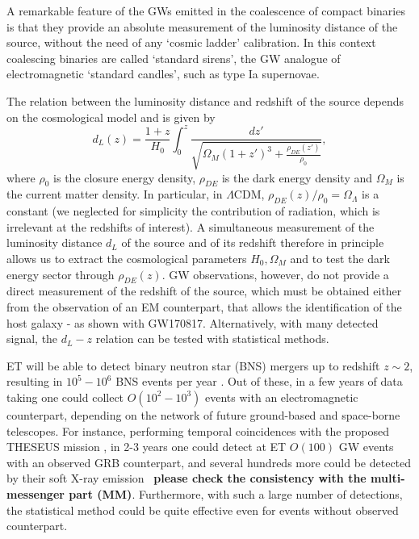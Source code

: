 A remarkable feature of the GWs emitted in the coalescence of compact binaries is that  they  provide an absolute measurement of the luminosity distance of the source, without the need of any `cosmic ladder' calibration. In this context coalescing binaries are called `standard sirens', the GW analogue of electromagnetic `standard candles', such as type Ia supernovae. 

The relation between the luminosity distance and redshift of the source depends on the cosmological model and is given by 
\begin{equation}\label{eq:dL(z)}
d_L(z)=\frac{1+z}{H_0}\int_0^z \frac{dz'}{\sqrt{\Omega_M(1+z')^3+\frac{\rho_{DE}(z')}{\rho_0}}},
\end{equation}
where $\rho_0$ is the closure energy density, $\rho_{DE}$ is the dark energy density and $\Omega_M$ is the current matter density. In particular, in $\Lambda$CDM, $\rho_{DE}(z)/\rho_0=\Omega_{\Lambda}$ is a constant (we neglected for simplicity the contribution of radiation, which is irrelevant at the redshifts of interest). A simultaneous measurement of the luminosity distance $d_L$ of the source and of its redshift therefore in principle allows us to extract the cosmological parameters $H_0,\Omega_M$ and to test the dark energy sector through $\rho_{DE}(z)$. GW observations, however, do not provide a direct measurement of the redshift of the source, which must be obtained either from the observation of an EM counterpart, that allows the identification  of the host galaxy - as shown with GW170817. Alternatively, with many detected signal, the $d_L-z$ relation can be tested with  statistical methods.

ET will be able to detect binary neutron star (BNS) mergers up to redshift $z\sim 2$, resulting in $10^5-10^6$ BNS events per year \cite{Sathyaprakash:2009xt}. Out of these,  in a few years of data taking one could collect $O(10^2-10^3)$ events with an electromagnetic counterpart, depending on the network of future ground-based and space-borne telescopes. For instance, performing temporal coincidences with the proposed THESEUS mission \cite{Amati:2017npy}, in 2-3 years one could detect at ET $O(100)$ GW events with an observed GRB counterpart, and several hundreds more could be detected by their soft X-ray emission~\cite{Stratta:2017bwq} {\bf please check the consistency with the multi-messenger part (MM)}. Furthermore, with such a large number of detections, the statistical method could be  quite effective even for events without observed counterpart.

